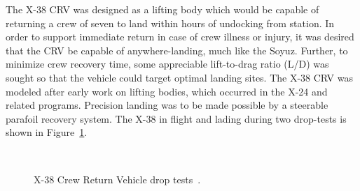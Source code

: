 The X-38 CRV was designed as a lifting body which would be capable of returning a crew of seven to land within hours of undocking from station.  In order to support immediate return in case of crew illness or injury, it was desired that the CRV be capable of anywhere-landing, much like the Soyuz.  Further, to minimize crew recovery time, some appreciable lift-to-drag ratio (L/D) was sought so that the vehicle could target optimal landing sites.  The X-38 CRV was modeled after early work on lifting bodies, which occurred in the X-24 and related programs.  Precision landing was to be made possible by a steerable parafoil recovery system. The X-38 in flight and lading during two drop-tests is shown in Figure~\ref{fig:x38_drop}.
\begin{figure}[hbtp]
  \begin{center}
     \\
    \caption[X-38 Crew Return Vehicle drop tests.]{X-38 Crew Return Vehicle drop tests~\cite{dfrc_photo_gallery}.\label{fig:x38_drop}}
  \end{center}
\end{figure}

